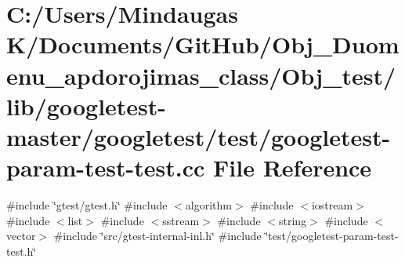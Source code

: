 \hypertarget{_obj__test_2lib_2googletest-master_2googletest_2test_2googletest-param-test-test_8cc}{}\section{C\+:/\+Users/\+Mindaugas K/\+Documents/\+Git\+Hub/\+Obj\+\_\+\+Duomenu\+\_\+apdorojimas\+\_\+class/\+Obj\+\_\+test/lib/googletest-\/master/googletest/test/googletest-\/param-\/test-\/test.cc File Reference}
\label{_obj__test_2lib_2googletest-master_2googletest_2test_2googletest-param-test-test_8cc}
{\ttfamily \#include \char`\"{}gtest/gtest.\+h\char`\"{}}\newline
{\ttfamily \#include $<$algorithm$>$}\newline
{\ttfamily \#include $<$iostream$>$}\newline
{\ttfamily \#include $<$list$>$}\newline
{\ttfamily \#include $<$sstream$>$}\newline
{\ttfamily \#include $<$string$>$}\newline
{\ttfamily \#include $<$vector$>$}\newline
{\ttfamily \#include \char`\"{}src/gtest-\/internal-\/inl.\+h\char`\"{}}\newline
{\ttfamily \#include \char`\"{}test/googletest-\/param-\/test-\/test.\+h\char`\"{}}\newline

